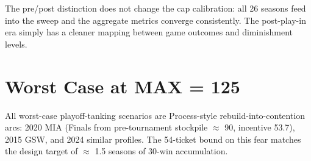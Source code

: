 \documentclass[10pt,letterpaper]{article}
\begin{document}
The pre/post distinction does not change the cap calibration: all 26 seasons feed into the sweep and the aggregate metrics converge consistently. The post-play-in era simply has a cleaner mapping between game outcomes and diminishment levels.

\section*{Worst Case at MAX = 125}

All worst-case playoff-tanking scenarios are Process-style rebuild-into-contention arcs: 2020 MIA (Finals from pre-tournament stockpile $\approx$ 90, incentive 53.7), 2015 GSW, and 2024 similar profiles. The 54-ticket bound on this fear matches the design target of $\approx$ 1.5 seasons of 30-win accumulation.
\end{document}
